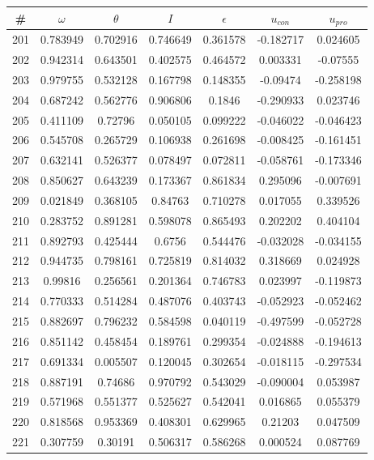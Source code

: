 \begin{table}
\begin{tabular}{c|c|c|c|c|c|c}
\# & $\omega$ & $\theta$ & $I$ & $\epsilon$ & $u_{con}$ & $u_{pro}$\\
\hline
201 & 0.783949 & 0.702916 & 0.746649 & 0.361578 & -0.182717 & 0.024605\\
202 & 0.942314 & 0.643501 & 0.402575 & 0.464572 & 0.003331 & -0.07555\\
203 & 0.979755 & 0.532128 & 0.167798 & 0.148355 & -0.09474 & -0.258198\\
204 & 0.687242 & 0.562776 & 0.906806 & 0.1846 & -0.290933 & 0.023746\\
205 & 0.411109 & 0.72796 & 0.050105 & 0.099222 & -0.046022 & -0.046423\\
206 & 0.545708 & 0.265729 & 0.106938 & 0.261698 & -0.008425 & -0.161451\\
207 & 0.632141 & 0.526377 & 0.078497 & 0.072811 & -0.058761 & -0.173346\\
208 & 0.850627 & 0.643239 & 0.173367 & 0.861834 & 0.295096 & -0.007691\\
209 & 0.021849 & 0.368105 & 0.84763 & 0.710278 & 0.017055 & 0.339526\\
210 & 0.283752 & 0.891281 & 0.598078 & 0.865493 & 0.202202 & 0.404104\\
211 & 0.892793 & 0.425444 & 0.6756 & 0.544476 & -0.032028 & -0.034155\\
212 & 0.944735 & 0.798161 & 0.725819 & 0.814032 & 0.318669 & 0.024928\\
213 & 0.99816 & 0.256561 & 0.201364 & 0.746783 & 0.023997 & -0.119873\\
214 & 0.770333 & 0.514284 & 0.487076 & 0.403743 & -0.052923 & -0.052462\\
215 & 0.882697 & 0.796232 & 0.584598 & 0.040119 & -0.497599 & -0.052728\\
216 & 0.851142 & 0.458454 & 0.189761 & 0.299354 & -0.024888 & -0.194613\\
217 & 0.691334 & 0.005507 & 0.120045 & 0.302654 & -0.018115 & -0.297534\\
218 & 0.887191 & 0.74686 & 0.970792 & 0.543029 & -0.090004 & 0.053987\\
219 & 0.571968 & 0.551377 & 0.525627 & 0.542041 & 0.016865 & 0.055379\\
220 & 0.818568 & 0.953369 & 0.408301 & 0.629965 & 0.21203 & 0.047509\\
221 & 0.307759 & 0.30191 & 0.506317 & 0.586268 & 0.000524 & 0.087769\\

\end{tabular}
\end{table}
